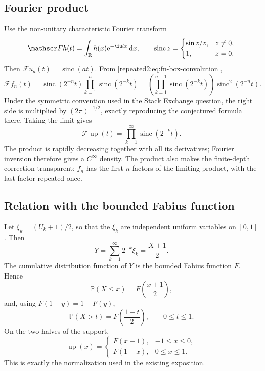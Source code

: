 \documentclass[11pt,oneside]{article}
\theoremstyle{definition}
\theoremstyle{remark}
\newcommand{\R}{\mathbb R}
\newcommand{\Up}{\operatorname{up}}
\newcommand{\sinc}{\operatorname{sinc}}
\newcommand{\e}{\mathrm e}
\newcommand{\dd}{\,\mathrm d}
\newcommand{\Prob}{\mathbb P}
\begin{document}
\subsection{Fourier product}

Use the non-unitary characteristic Fourier transform
\begin{equation}
 \mathscr F h(t)=\int_{\R}h(x)\e^{-\iu tx}\dd x,
 \qquad \sinc z=\begin{cases}\sin z/z,&z\ne0,\\1,&z=0.\end{cases}
 \label{repeated2:eq:fourier-convention}
\end{equation}
Then $\mathscr F u_a(t)=\sinc(at)$.  From \eqref{repeated2:eq:fn-box-convolution},
\begin{equation}
 \mathscr F f_n(t)
 =\sinc(2^{-n}t)\prod_{k=1}^{n}\sinc(2^{-k}t)
 =\left(\prod_{k=1}^{n-1}\sinc(2^{-k}t)\right)\sinc^2(2^{-n}t).
 \label{repeated2:eq:finite-fourier-product}
\end{equation}
Under the symmetric convention used in the Stack Exchange question, the right side is
multiplied by $(2\pi)^{-1/2}$, exactly reproducing the conjectured formula there.
Taking the limit gives
\begin{equation}
 \mathscr F\Up(t)=\prod_{k=1}^{\infty}\sinc(2^{-k}t).
 \label{repeated2:eq:up-fourier-product}
\end{equation}
The product is rapidly decreasing together with all its derivatives; Fourier inversion
therefore gives a $C^\infty$ density.  The product also makes the finite-depth correction
transparent: $f_n$ has the first $n$ factors of the limiting product, with the last factor
repeated once.

\subsection{Relation with the bounded Fabius function}

Let $\xi_k=(U_k+1)/2$, so that the $\xi_k$ are independent uniform variables on $[0,1]$.
Then
\begin{equation}
 Y=\sum_{k=1}^{\infty}2^{-k}\xi_k=\frac{X+1}{2}.
 \label{repeated2:eq:Y-X-relation}
\end{equation}
The cumulative distribution function of $Y$ is the bounded Fabius function $F$.  Hence
\begin{equation}
 \Prob(X\le x)=F\left(\frac{x+1}{2}\right),
 \label{repeated2:eq:X-cdf-F}
\end{equation}
and, using $F(1-y)=1-F(y)$,
\begin{equation}
 \Prob(X>t)=F\left(\frac{1-t}{2}\right),\qquad 0\le t\le1.
 \label{repeated2:eq:X-tail-F}
\end{equation}
On the two halves of the support,
\begin{equation}
 \Up(x)=
 \begin{cases}
 F(x+1),&-1\le x\le0,\\
 F(1-x),&0\le x\le1.
 \end{cases}
 \label{repeated2:eq:up-F-relation}
\end{equation}
This is exactly the normalization used in the existing exposition.
\end{document}
